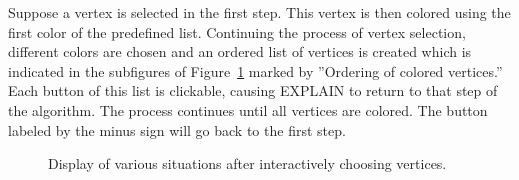 \documentclass[12pt, twoside,a4paper,toc=bibliography]{scrbook}
\newcommand{\figref}[1]{Figure~\protect\ref{#1}}
\begin{document}
Suppose a vertex is selected in the first step.
This vertex is then colored using the first color of the predefined list.
Continuing the process of vertex selection,
different colors are chosen and an ordered list of vertices is created
which is indicated in the subfigures of \figref{algorihtm} marked by ''Ordering of colored vertices.''
Each button of this list is clickable, causing \mbox{EXPLAIN} to return to that step of the algorithm.
The process continues until all vertices are colored.
The button labeled by the minus sign will go back to the first step.


\begin{figure}
\centering
{}
\centering
{}
\centering
{}
\centering
{}
\caption{Display of various situations after interactively choosing vertices.}
\label{algorihtm}
\end{figure}
\end{document}
